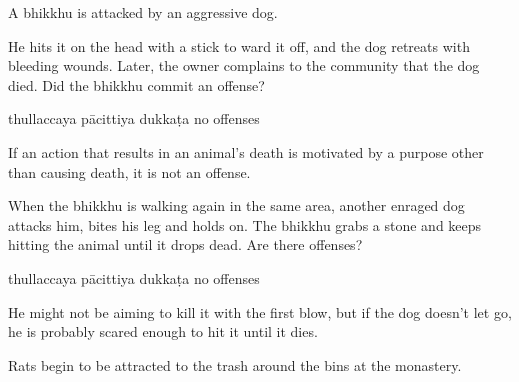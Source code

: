 \begin{exam}{\autoExamName}
\begin{problem*}

  A bhikkhu is attacked by an aggressive dog.

  \begin{parts}

    \item He hits it on the head with a stick to ward it off, and the dog retreats with bleeding wounds. Later, the owner complains to the community that the dog died. Did the bhikkhu commit an offense?

    \bigskip

    \begin{answers}{4}
      \bChoices
       thullaccaya \eAns
       pācittiya\eAns
       dukkaṭa\eAns
       no offenses\eAns
      \eChoices
    \end{answers}

    \begin{solution}
      If an action that results in an animal's death is motivated by a purpose other than causing death, it is not an offense.
    \end{solution}

    \bigskip

    \item When the bhikkhu is walking again in the same area, another enraged dog attacks him, bites his leg and holds on. The bhikkhu grabs a stone and keeps hitting the animal until it drops dead. Are there offenses?

    \bigskip

    \begin{answers}{4}
      \bChoices
       thullaccaya \eAns
       pācittiya\eAns
       dukkaṭa\eAns
       no offenses\eAns
      \eChoices
    \end{answers}

    \begin{solution}
      He might not be aiming to kill it with the first blow, but if the dog doesn't let go, he is probably scared enough to hit it until it dies.
    \end{solution}

  \end{parts}

\end{problem*}

\problemDivide

\begin{problem*}

  Rats begin to be attracted to the trash around the bins at the monastery.



\end{problem*}
\end{exam}
